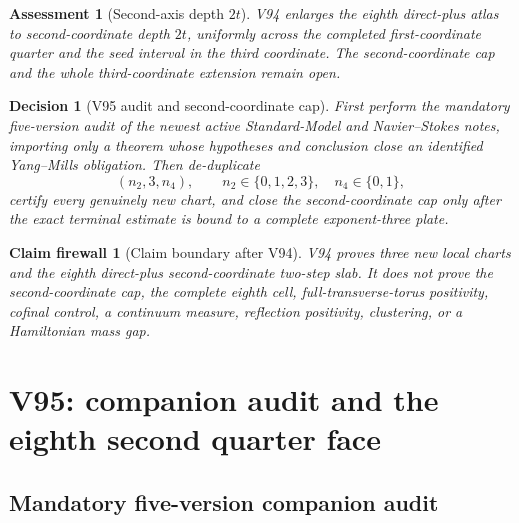 \documentclass[11pt,oneside]{article}
\newtheorem{assessment}[theorem]{Assessment}
\newtheorem{firewall}[theorem]{Claim firewall}
\newtheorem{decision}[theorem]{Decision}
\theoremstyle{definition}
\theoremstyle{remark}
\begin{document}
\begin{assessment}[Second-axis depth \(2t\)]
\label{ass:newv94}
V94 enlarges the eighth direct-plus atlas to second-coordinate
depth \(2t\), uniformly across the completed first-coordinate
quarter and the seed interval in the third coordinate.  The
second-coordinate cap and the whole third-coordinate extension
remain open.
\end{assessment}

\begin{decision}[V95 audit and second-coordinate cap]
\label{dec:newv94-next}
First perform the mandatory five-version audit of the newest active
Standard-Model and Navier--Stokes notes, importing only a theorem
whose hypotheses and conclusion close an identified Yang--Mills
obligation.  Then de-duplicate
\[
 (n_2,3,n_4),\qquad n_2\in\{0,1,2,3\},\quad
 n_4\in\{0,1\},                                     \tag{94.12}
\]
certify every genuinely new chart, and close the
second-coordinate cap only after the exact terminal estimate is
bound to a complete exponent-three plate.
\end{decision}

\begin{firewall}[Claim boundary after V94]
\label{fire:newv94-final}
V94 proves three new local charts and the eighth direct-plus
second-coordinate two-step slab.  It does not prove the
second-coordinate cap, the complete eighth cell,
full-transverse-torus positivity, cofinal control, a continuum
measure, reflection positivity, clustering, or a Hamiltonian mass
gap.
\end{firewall}

\section{V95: companion audit and the eighth second quarter face}
\label{sec:newv95-eighth-second-quarter}

\subsection{Mandatory five-version companion audit}
\end{document}
